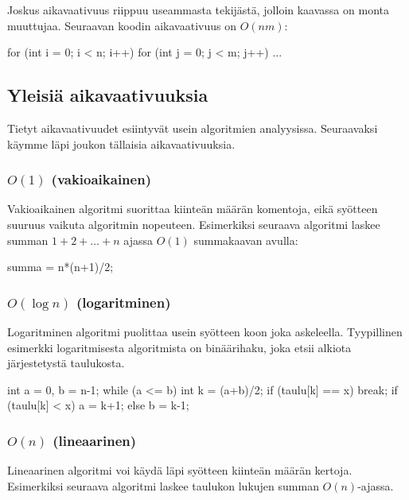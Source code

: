 Joskus aikavaativuus riippuu useammasta tekijästä,
jolloin kaavassa on monta muuttujaa.
Seuraavan koodin aikavaativuus on $O(nm)$:

\begin{code}
for (int i = 0; i < n; i++) {
    for (int j = 0; j < m; j++) {
        ...
    }
}
\end{code}

\subsection{Yleisiä aikavaativuuksia}

Tietyt aikavaativuudet esiintyvät usein algoritmien analyysissa.
Seuraavaksi käymme läpi joukon tällaisia aikavaativuuksia.

\subsubsection{$O(1)$ (vakioaikainen)}

Vakioaikainen algoritmi suorittaa kiinteän määrän komentoja,
eikä syötteen suuruus vaikuta algoritmin nopeuteen.
Esimerkiksi seuraava algoritmi laskee summan $1+2+\dots+n$
ajassa $O(1)$ summakaavan avulla:

\begin{code}
summa = n*(n+1)/2;
\end{code}

\subsubsection{$O(\log n)$ (logaritminen)}

Logaritminen algoritmi puolittaa usein syötteen koon
joka askeleella. Tyypillinen esimerkki logaritmisesta algoritmista
on binäärihaku, joka etsii alkiota järjestetystä taulukosta.

\begin{code}
int a = 0, b = n-1;
while (a <= b) {
    int k = (a+b)/2;
    if (taulu[k] == x) break;
    if (taulu[k] < x) a = k+1;
    else b = k-1;
}
\end{code}

\subsubsection{$O(n)$ (lineaarinen)}

Lineaarinen algoritmi voi käydä läpi syötteen kiinteän määrän kertoja.
Esimerkiksi seuraava algoritmi laskee taulukon lukujen summan $O(n)$-ajassa.

